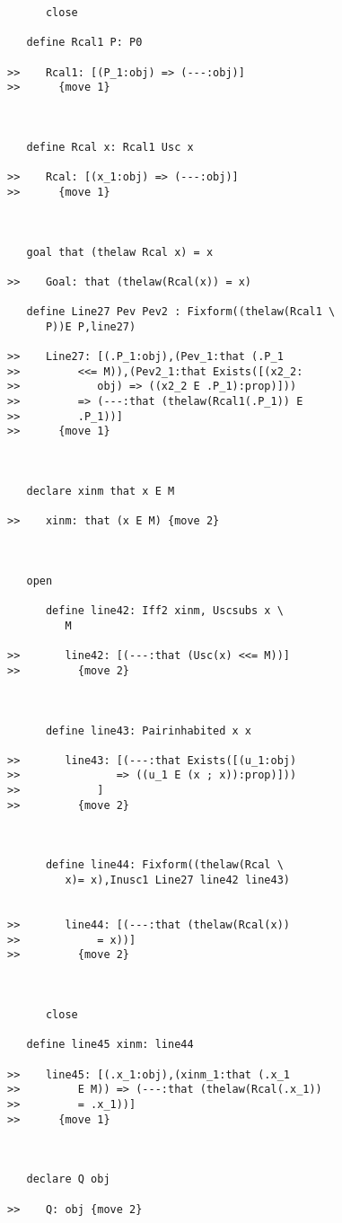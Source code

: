 \documentclass[12pt]{article}
\begin{document}
\begin{verbatim}
      close

   define Rcal1 P: P0

>>    Rcal1: [(P_1:obj) => (---:obj)]
>>      {move 1}



   define Rcal x: Rcal1 Usc x

>>    Rcal: [(x_1:obj) => (---:obj)]
>>      {move 1}



   goal that (thelaw Rcal x) = x

>>    Goal: that (thelaw(Rcal(x)) = x)

   define Line27 Pev Pev2 : Fixform((thelaw(Rcal1 \
      P))E P,line27)

>>    Line27: [(.P_1:obj),(Pev_1:that (.P_1
>>         <<= M)),(Pev2_1:that Exists([(x2_2:
>>            obj) => ((x2_2 E .P_1):prop)]))
>>         => (---:that (thelaw(Rcal1(.P_1)) E
>>         .P_1))]
>>      {move 1}



   declare xinm that x E M

>>    xinm: that (x E M) {move 2}



   open

      define line42: Iff2 xinm, Uscsubs x \
         M

>>       line42: [(---:that (Usc(x) <<= M))]
>>         {move 2}



      define line43: Pairinhabited x x

>>       line43: [(---:that Exists([(u_1:obj)
>>               => ((u_1 E (x ; x)):prop)]))
>>            ]
>>         {move 2}



      define line44: Fixform((thelaw(Rcal \
         x)= x),Inusc1 Line27 line42 line43)


>>       line44: [(---:that (thelaw(Rcal(x))
>>            = x))]
>>         {move 2}



      close

   define line45 xinm: line44

>>    line45: [(.x_1:obj),(xinm_1:that (.x_1
>>         E M)) => (---:that (thelaw(Rcal(.x_1))
>>         = .x_1))]
>>      {move 1}



   declare Q obj

>>    Q: obj {move 2}




\end{verbatim}
\end{document}
